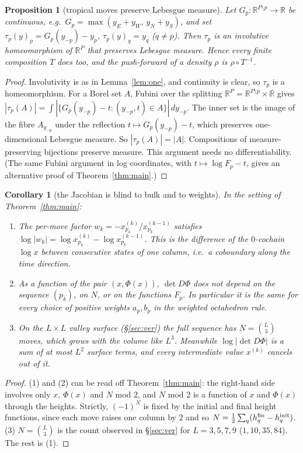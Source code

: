 \documentclass[11pt]{article}
\newtheorem{proposition}[theorem]{Proposition}
\newtheorem{corollary}[theorem]{Corollary}
\theoremstyle{definition}
\begin{document}
\begin{proposition}[tropical moves preserve Lebesgue measure]\label{prop:trop}
Let $G_p:\mathbb R^{P\setminus p}\to\mathbb R$ be continuous, e.g.\
$G_p=\max(y_E+y_W,\,y_N+y_S)$, and set $\tau_p(y)_p=G_p(y_{-p})-y_p$, $\tau_p(y)_q=y_q$ ($q\neq p$).
Then $\tau_p$ is an involutive homeomorphism of $\mathbb R^P$ that preserves Lebesgue measure.
Hence every finite composition $T$ does too, and the push-forward of a density $\rho$ is
$\rho\circ T^{-1}$.
\end{proposition}
\begin{proof}
Involutivity is as in Lemma~\ref{lem:one}, and continuity is clear, so $\tau_p$ is a
homeomorphism. For a Borel set $A$, Fubini over the splitting $\mathbb R^P=\mathbb R^{P\setminus p}\times\mathbb R$
gives $|\tau_p(A)|=\int |\{G_p(y_{-p})-t : (y_{-p},t)\in A\}|\,dy_{-p}$. The inner set is the image of the
fibre $A_{y_{-p}}$ under the reflection $t\mapsto G_p(y_{-p})-t$, which preserves one-dimensional
Lebesgue measure. So $|\tau_p(A)|=|A|$. Compositions of measure-preserving bijections preserve
measure. This argument needs no differentiability. (The same Fubini argument in log coordinates,
with $t\mapsto\log F_p-t$, gives an alternative proof of Theorem~\ref{thm:main}.)
\end{proof}

\begin{corollary}[the Jacobian is blind to bulk and to weights]\label{cor:blind}
In the setting of Theorem~\ref{thm:main}:
\begin{enumerate}
\item The per-move factor $w_k=-x^{(k)}_{p_k}/x^{(k-1)}_{p_k}$ satisfies
$\log|w_k| = \log x^{(k)}_{p_k}-\log x^{(k-1)}_{p_k}$. This is the difference of the $0$-cochain $\log x$
between consecutive states of one column, i.e.\ a coboundary along the time direction.
\item As a function of the pair $(x,\Phi(x))$, $\det D\Phi$ does not depend on the sequence
$(p_k)$, on $N$, or on the functions $F_p$. In particular it is the same for every choice of positive
weights $a_p,b_p$ in the weighted octahedron rule.
\item On the $L\times L$ valley surface (\S\ref{sec:ver}) the full sequence has $N=\binom{L}{3}$ moves,
which grows with the \emph{volume} like $L^3$. Meanwhile $\log|\det D\Phi|$ is a sum of at most $L^2$
surface terms, and every intermediate value $x^{(k)}$ cancels out of it.
\end{enumerate}
\end{corollary}
\begin{proof}
(1) and (2) can be read off Theorem~\ref{thm:main}: the right-hand side involves only $x$, $\Phi(x)$ and
$N$ mod 2, and $N$ mod 2 is a function of $x$ and $\Phi(x)$ through the heights. Strictly, $(-1)^N$
is fixed by the initial and final height functions, since each move raises one column by $2$ and so
$N=\tfrac12\sum_q(h^{\rm fin}_q-h^{\rm init}_q)$. (3) $N=\binom L3$ is the count observed
in \S\ref{sec:ver} for $L=3,5,7,9$ ($1,10,35,84$). The rest is (1).
\end{proof}
\end{document}

